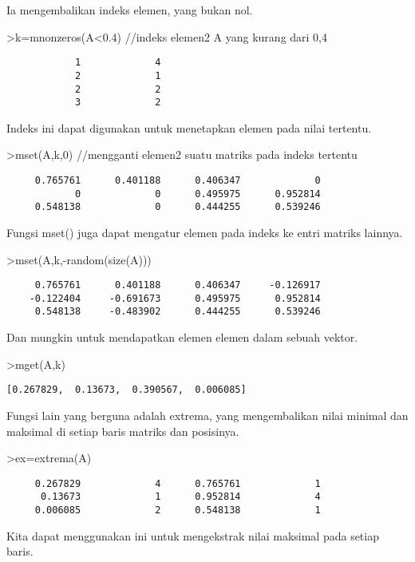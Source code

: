 \documentclass[
]{book}
\begin{document}
Ia mengembalikan indeks elemen, yang bukan nol.

\textgreater k=mnonzeros(A\textless0.4) //indeks elemen2 A yang kurang dari 0,4

\begin{verbatim}
            1             4 
            2             1 
            2             2 
            3             2 
\end{verbatim}

Indeks ini dapat digunakan untuk menetapkan elemen pada nilai tertentu.

\textgreater mset(A,k,0) //mengganti elemen2 suatu matriks pada indeks tertentu

\begin{verbatim}
     0.765761      0.401188      0.406347             0 
            0             0      0.495975      0.952814 
     0.548138             0      0.444255      0.539246 
\end{verbatim}

Fungsi mset() juga dapat mengatur elemen pada indeks ke entri matriks lainnya.

\textgreater mset(A,k,-random(size(A)))

\begin{verbatim}
     0.765761      0.401188      0.406347     -0.126917 
    -0.122404     -0.691673      0.495975      0.952814 
     0.548138     -0.483902      0.444255      0.539246 
\end{verbatim}

Dan mungkin untuk mendapatkan elemen elemen dalam sebuah vektor.

\textgreater mget(A,k)

\begin{verbatim}
[0.267829,  0.13673,  0.390567,  0.006085]
\end{verbatim}

Fungsi lain yang berguna adalah extrema, yang mengembalikan nilai minimal dan maksimal di setiap baris matriks dan posisinya.

\textgreater ex=extrema(A)

\begin{verbatim}
     0.267829             4      0.765761             1 
      0.13673             1      0.952814             4 
     0.006085             2      0.548138             1 
\end{verbatim}

Kita dapat menggunakan ini untuk mengekstrak nilai maksimal pada setiap baris.
\end{document}
